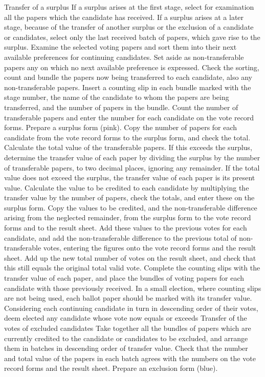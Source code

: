 Transfer of a surplus
If a surplus arises at the first stage, select for examination all the papers which the candidate has received.
If a surplus arises at a later stage, because of the transfer of another surplus or the exclusion of a candidate or candidates, select only the last received batch of papers, which gave rise to the surplus.
Examine the selected voting papers and sort them into their next available preferences for continuing candidates. Set aside as non-transferable papers any on which no next available preference is expressed.
Check the sorting, count and bundle the papers now being transferred to each candidate, also any non-transferable papers. Insert a counting slip in each bundle marked with the stage number, the name of the candidate to whom the papers are being transferred, and the number of papers in the bundle.
Count the number of transferable papers and enter the number for each candidate on the vote record forms.
Prepare a surplus form (pink). Copy the number of papers for each candidate from the vote record forms to the surplus form, and check the total.
Calculate the total value of the transferable papers. If this exceeds the surplus, determine the transfer value of each paper by dividing the surplus by the number of transferable papers, to two decimal places, ignoring any remainder. If the total value does not exceed the surplus, the transfer value of each paper is its present value.
Calculate the value to be credited to each candidate by multiplying the transfer value by the number of papers, check the totals, and enter these on the surplus form.
Copy the values to be credited, and the non-transferable difference arising from the neglected remainder, from the surplus form to the vote record forms and to the result sheet.
Add these values to the previous votes for each candidate, and add the non-transferable difference to the previous total of non-transferable votes, entering the figures onto the vote record forms and the result sheet.
Add up the new total number of votes on the result sheet, and check that this still equals the original total valid vote.
Complete the counting slips with the transfer value of each paper, and place the bundles of voting papers for each candidate with those previously received. In a small election, where counting slips are not being used, each ballot paper should be marked with its transfer value.
Considering each continuing candidate in turn in descending order of their votes, deem elected any candidate whose vote now equals or exceeds
Transfer of the votes of excluded candidates
Take together all the bundles of papers which are currently credited to the candidate or candidates to be excluded, and arrange them in batches in descending order of transfer value. Check that the number and total value of the papers in each batch agrees with the numbers on the vote record forms and the result sheet. Prepare an exclusion form (blue).
